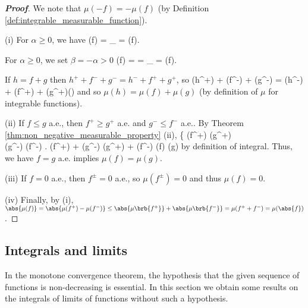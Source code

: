\begin{proof}[\bf Proof]
We note that $\mu(-f) = -\mu(f)$ (by Definition \ref{def:integrable_measurable_function}).
\ben
\item [(i)] For $\alpha \geq 0$, we have
\be
\mu(\alpha f) = _{} = \alpha\mu(f).
\ee

For $\alpha \geq 0$, we set $\beta = -\alpha >0$
\be
\mu(\alpha f) = \mu{} = _{} = \alpha \mu(f).
\ee

If $h = f + g$ then $h^+ + f^- + g^- = h^- + f^+ + g^+$, so
\be
\mu(h^+) + \mu(f^-) + \mu(g^-) = \mu(h^-) + \mu(f^+) + \mu(g^+)\quad\quad ()
\ee
and so $\mu(h) = \mu(f)+\mu(g)$ (by definition of $\mu$ for integrable functions).

\item [(ii)] If $f \leq g$ a.e., then $f^+ \geq g^+$ a.e. and $g^-\leq f^-$ a.e.. By Theorem \ref{thm:non_negative_measurable_property} (ii),
\be
\left\{
\mu(f^+) \leq \mu(g^+) \\
\mu(g^-) \leq \mu(f^-)
\ea\right. \quad\ra\quad \mu(f^+) + \mu(g^-) \leq \mu(g^+) + \mu(f^-) \quad\ra\quad \mu(f) \leq \mu(g)
\ee
by definition of integral. Thus, we have $f=g$ a.e. implies $\mu(f) = \mu(g)$.

\item [(iii)] If $f = 0$ a.e., then $f^\pm = 0$ a.e., so $\mu(f^\pm) = 0$ and thus $\mu(f) = 0$.

\item [(iv)] Finally, by (i), $\abs{\mu(f)} = \abs{\mu(f^+)-\mu(f^-)} \leq \abs{\mu\brb{f^+}} + \abs{\mu\brb{f^-}} = \mu(f^++f^-) = \mu(\abs{f})$.
\een
\end{proof}

\subsection{Integrals and limits}

In the monotone convergence theorem, the hypothesis that the given sequence of functions is non-decreasing is essential. In this section we obtain some results on the integrals of limits of functions without such a hypothesis.

